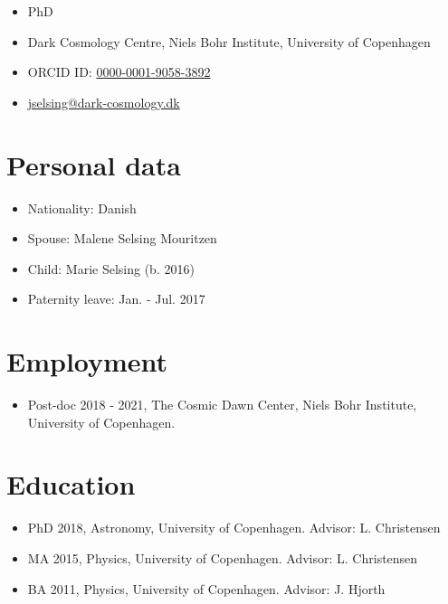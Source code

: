 \documentclass[12pt,letterpaper]{article}
\begin{document}
\thispagestyle{empty}\sloppy\sloppypar

{\huge \name}
\vspace{-0.25em}

\begin{itemize}
  \item PhD
  \item Dark Cosmology Centre, Niels Bohr Institute, University of Copenhagen
  \item  ORCID ID: \href{https://orcid.org/0000-0001-9058-3892}{0000-0001-9058-3892}
  \item \href{mailto:jselsing@dark-cosmology.dk}{jselsing@dark-cosmology.dk} 
\end{itemize}


\section*{Personal data}

\begin{itemize}
	\item Nationality: Danish
	\item Spouse: Malene Selsing Mouritzen
	\item Child: Marie Selsing (b. 2016) 
	\item Paternity leave: Jan. - Jul. 2017
	
\end{itemize}


\section*{Employment}
\begin{itemize}
	\item Post-doc 2018 - 2021, The Cosmic Dawn Center, Niels Bohr Institute, University of Copenhagen.
\end{itemize}


\section*{Education}
	\begin{itemize}
	\item PhD 2018, Astronomy, University of Copenhagen.
		{Advisor: L. Christensen}
	\item MA 2015, Physics, University of Copenhagen.
		{Advisor: L. Christensen}
	\item BA 2011, Physics, University of Copenhagen.
		{Advisor: J. Hjorth}
	\end{itemize}
\end{document}
